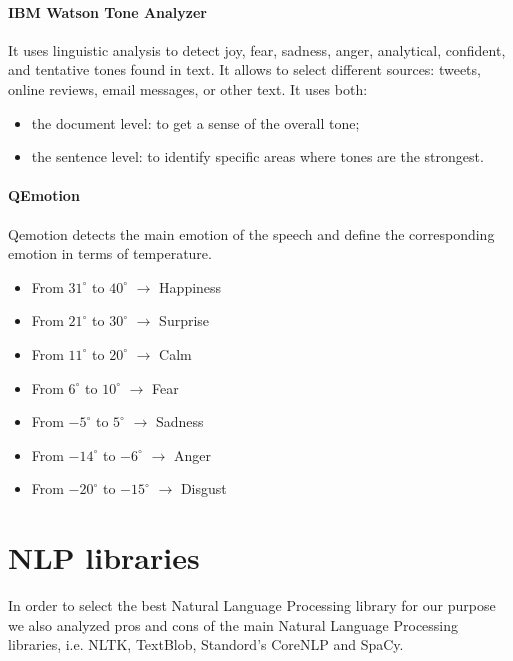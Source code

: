 \paragraph{IBM Watson Tone Analyzer}\cite{ibm_watson_tone}
It uses linguistic analysis to detect joy, fear, sadness, anger, analytical, confident, and tentative tones found in text. It allows to select different sources: tweets, online reviews, email messages, or other text. It uses both:
\begin{itemize}
\item the document level: to get a sense of the overall tone;
\item the sentence level: to identify specific areas where tones are the strongest.
\end{itemize}

\paragraph{QEmotion}\cite{qemotion}
Qemotion detects the main emotion of the speech and define the corresponding emotion in terms of temperature. 
\begin{itemize}
\item From $31^{\circ}$ to $40^{\circ}$ $\to$ Happiness
\item From $21^{\circ}$ to $30^{\circ}$ $\to$ Surprise
\item From $11^{\circ}$ to $20^{\circ}$ $\to $ Calm
\item From $6^{\circ}$ to $10^{\circ}$ $\to $ Fear
\item From $-5^{\circ}$ to $5^{\circ}$ $\to $ Sadness
\item From $-14^{\circ}$ to $-6^{\circ}$ $\to $ Anger
\item From $-20^{\circ}$ to $-15^{\circ}$ $\to $ Disgust
\end{itemize}


\section{NLP libraries}
In order to select the best Natural Language Processing library for our purpose we also analyzed pros and cons of the main Natural Language Processing libraries, i.e. NLTK, TextBlob, Standord's CoreNLP and SpaCy. 

